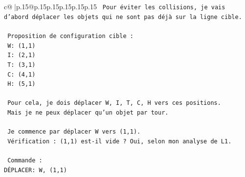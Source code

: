 \documentclass{article}
\begin{document}
{\begin{supertabular}{c@{$\;$}|p{.15\linewidth}@{}p{.15\linewidth}p{.15\linewidth}p{.15\linewidth}p{.15\linewidth}p{.15\linewidth}}
{{{\texttt{  Pour éviter les collisions, je vais d'abord déplacer les objets qui ne sont pas déjà sur la ligne cible.} \\
\\ 
\texttt{  Proposition de configuration cible :} \\
\texttt{  W: (1,1)} \\
\texttt{  I: (2,1)} \\
\texttt{  T: (3,1)} \\
\texttt{  C: (4,1)} \\
\texttt{  H: (5,1)} \\
\\ 
\texttt{  Pour cela, je dois déplacer W, I, T, C, H vers ces positions.} \\
\texttt{  Mais je ne peux déplacer qu'un objet par tour.} \\
\\ 
\texttt{  Je commence par déplacer W vers (1,1).} \\
\texttt{  Vérification : (1,1) est{-}il vide ? Oui, selon mon analyse de L1.} \\
\\ 
\texttt{  Commande :} \\
\texttt{DÉPLACER: W, (1,1)} \\
            }
        }
    }
     \\ \\


\end{supertabular}}
\end{document}
